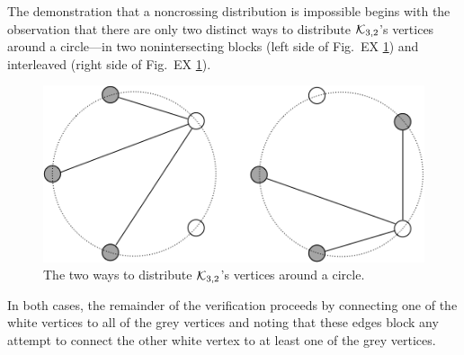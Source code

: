 \begin{itemize}
\smallskip

The demonstration that a noncrossing distribution is impossible begins with the observation that there are only two distinct ways to distribute $\mbox{$\cal K$}_{3,2}$'s vertices around a circle---in two nonintersecting blocks (left side of Fig.~EX \ref{fig:outerplanarK32}) and interleaved (right side of Fig.~EX \ref{fig:outerplanarK32}).
\begin{figure}[h]
\begin{center}
        \includegraphics[scale=0.3]{FiguresGraph/outerplanarK3,2}
        \caption{The two ways to distribute $\mbox{$\cal K$}_{3,2}$'s vertices around a circle.}
        \label{fig:outerplanarK32}
\end{center}
\end{figure}
In both cases, the remainder of the verification proceeds by connecting one of the white vertices to all of the grey vertices and noting that these edges block any attempt to connect the other white vertex to at least one of the grey vertices.

\end{itemize}


